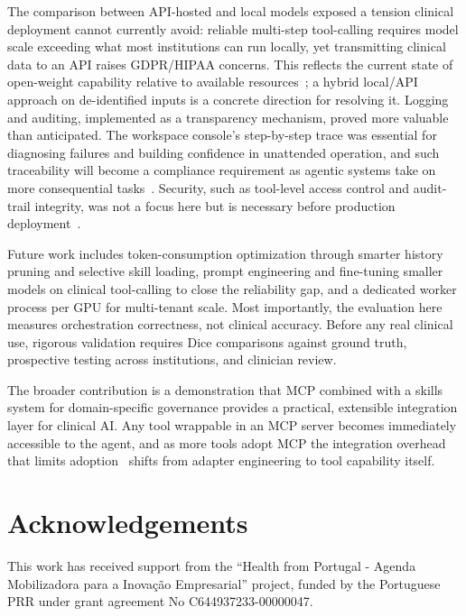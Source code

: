 \documentclass[conference]{IEEEtran}
\begin{document}
The comparison between API-hosted and local models exposed a tension clinical deployment cannot currently avoid: reliable multi-step tool-calling requires model scale exceeding what most institutions can run locally, yet transmitting clinical data to an API raises GDPR/HIPAA concerns. This reflects the current state of open-weight capability relative to available resources~\cite{agiformedicalimaging2025}; a hybrid local/API approach on de-identified inputs is a concrete direction for resolving it. Logging and auditing, implemented as a transparency mechanism, proved more valuable than anticipated. The workspace console's step-by-step trace was essential for diagnosing failures and building confidence in unattended operation, and such traceability will become a compliance requirement as agentic systems take on more consequential tasks~\cite{trustworthyai2025, dietrich2025agentic}. Security, such as tool-level access control and audit-trail integrity, was not a focus here but is necessary before production deployment~\cite{transformingclinical2026}.

Future work includes token-consumption optimization through smarter history pruning and selective skill loading, prompt engineering and fine-tuning smaller models on clinical tool-calling to close the reliability gap, and a dedicated worker process per GPU for multi-tenant scale. Most importantly, the evaluation here measures orchestration correctness, not clinical accuracy. Before any real clinical use, rigorous validation requires Dice comparisons against ground truth, prospective testing across institutions, and clinician review. 

The broader contribution is a demonstration that MCP combined with a skills system for domain-specific governance provides a practical, extensible integration layer for clinical AI. Any tool wrappable in an MCP server becomes immediately accessible to the agent, and as more tools adopt MCP the integration overhead that limits adoption~\cite{collaco2026scoping} shifts from adapter engineering to tool capability itself.

\section{Acknowledgements}
This work has received support from the “Health from Portugal - Agenda Mobilizadora para a Inovação Empresarial” project, funded by the Portuguese PRR under grant agreement No C644937233-00000047.



\end{document}
